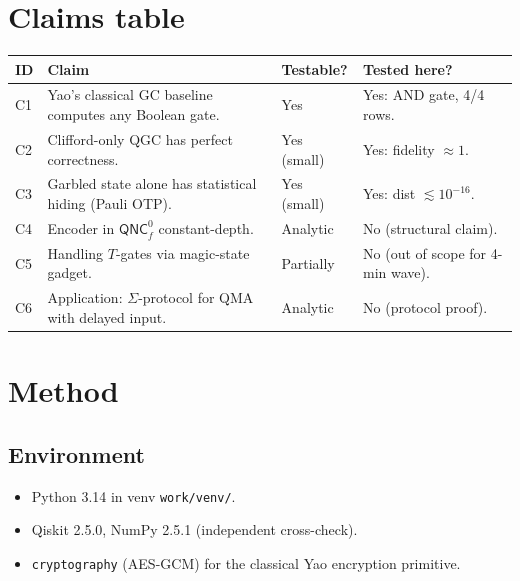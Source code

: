 \documentclass[11pt]{article}
\begin{document}
\section{Claims table}

\begin{tabular}{@{}llll@{}}
\toprule
ID & Claim & Testable? & Tested here? \\
\midrule
C1 & Yao's classical GC baseline computes any Boolean gate. & Yes & Yes: AND gate, 4/4 rows. \\
C2 & Clifford-only QGC has perfect correctness. & Yes (small) & Yes: fidelity $\approx 1$. \\
C3 & Garbled state alone has statistical hiding (Pauli OTP). & Yes (small) & Yes: dist $\lesssim 10^{-16}$. \\
C4 & Encoder in $\mathsf{QNC}^0_f$ constant-depth. & Analytic & No (structural claim). \\
C5 & Handling $T$-gates via magic-state gadget. & Partially & No (out of scope for 4-min wave). \\
C6 & Application: $\Sigma$-protocol for QMA with delayed input. & Analytic & No (protocol proof). \\
\bottomrule
\end{tabular}

\section{Method}
\subsection{Environment}
\begin{itemize}
  \item Python 3.14 in venv \texttt{work/venv/}.
  \item Qiskit 2.5.0, NumPy 2.5.1 (independent cross-check).
  \item \texttt{cryptography} (AES-GCM) for the classical Yao encryption primitive.
\end{itemize}
\end{document}
